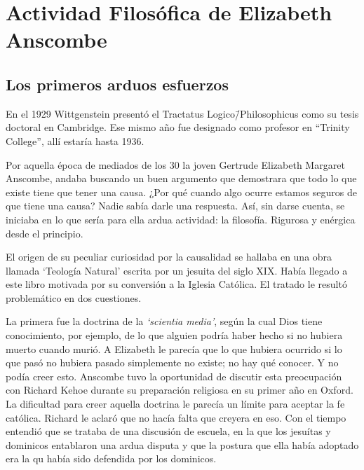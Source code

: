\section{Actividad Filosófica de Elizabeth Anscombe}

\subsection{Los primeros arduos esfuerzos}

En el 1929 Wittgenstein presentó el Tractatus Logico\=/Philosophicus como su
tesis doctoral en Cambridge. Ese mismo año fue designado como profesor en
``Trinity College'', allí estaría hasta 1936.


Por aquella época de mediados de los 30 la joven Gertrude Elizabeth Margaret
Anscombe, andaba buscando un buen argumento que demostrara que todo lo que
existe tiene que tener una causa. ¿Por qué cuando algo ocurre estamos seguros de
que tiene una causa? Nadie sabía darle una respuesta.\autocite[cf.~][p.~vii
]{anscombe1981metaphysicsintro} Así, sin darse cuenta, se iniciaba en lo que
sería para ella ardua actividad: la filosofía. Rigurosa y enérgica desde el
principio.

El origen de su peculiar curiosidad por la causalidad se hallaba en una obra
llamada `Teología Natural' escrita por un jesuita del siglo XIX. Había llegado a
este libro motivada por su conversión a la Iglesia
Católica.\autocite[cf.~][p.~vii]{anscombe1981metaphysicsintro} El tratado le
resultó problemático en dos cuestiones.

La primera fue la doctrina de la \emph{`scientia media'}, según la cual Dios
tiene conocimiento, por ejemplo, de lo que alguien podría haber hecho si no
hubiera muerto cuando murió. A Elizabeth le parecía que lo que hubiera ocurrido
si lo que pasó no hubiera pasado simplemente no existe; no hay qué conocer. Y no
podía creer esto. Anscombe tuvo la oportunidad de discutir esta preocupación con
Richard Kehoe durante su preparación religiosa en su primer año en Oxford. La
dificultad para creer aquella doctrina le parecía un límite para aceptar la fe
católica. Richard le aclaró que no hacía falta que creyera en eso. Con el tiempo
entendió que se trataba de una discusión de escuela, en la que los jesuítas y
dominicos entablaron una ardua disputa y que la postura que ella había adoptado
era la qu había sido defendida por los
dominicos.\autocite[cf.~][p.~vii]{anscombe1981metaphysicsintro}

